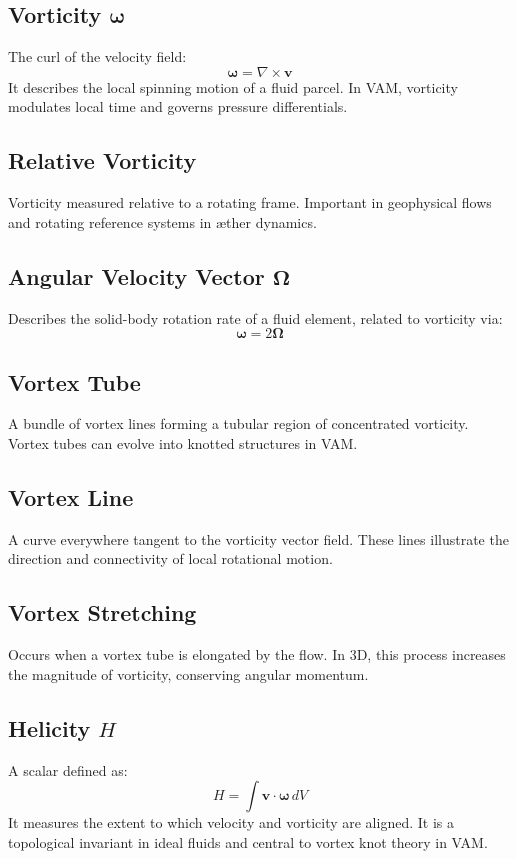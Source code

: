 \documentclass[a4paper, aps,preprint,superscriptaddress, 12pt]{revtex4}
\begin{document}
    \subsection*{Vorticity $\boldsymbol{\omega}$}
    The curl of the velocity field:
    \[ \boldsymbol{\omega} = \nabla \times \mathbf{v} \]
    It describes the local spinning motion of a fluid parcel. In VAM, vorticity modulates local time and governs pressure differentials.

    \subsection*{Relative Vorticity}
    Vorticity measured relative to a rotating frame. Important in geophysical flows and rotating reference systems in æther dynamics.

    \subsection*{Angular Velocity Vector $\boldsymbol{\Omega}$}
    Describes the solid-body rotation rate of a fluid element, related to vorticity via:
    \[ \boldsymbol{\omega} = 2\boldsymbol{\Omega} \]

    \subsection*{Vortex Tube}
    A bundle of vortex lines forming a tubular region of concentrated vorticity. Vortex tubes can evolve into knotted structures in VAM.

    \subsection*{Vortex Line}
    A curve everywhere tangent to the vorticity vector field. These lines illustrate the direction and connectivity of local rotational motion.

    \subsection*{Vortex Stretching}
    Occurs when a vortex tube is elongated by the flow. In 3D, this process increases the magnitude of vorticity, conserving angular momentum.

    \subsection*{Helicity $H$}
    A scalar defined as:
    \[ H = \int \mathbf{v} \cdot \boldsymbol{\omega} \, dV \]
    It measures the extent to which velocity and vorticity are aligned. It is a topological invariant in ideal fluids and central to vortex knot theory in VAM.
\end{document}
